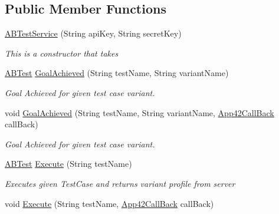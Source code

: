 \subsection*{Public Member Functions}
\begin{DoxyCompactItemize}
\item 
\hyperlink{classcom_1_1shephertz_1_1app42_1_1paas_1_1sdk_1_1csharp_1_1ab_test_1_1_a_b_test_service_a0e66bd8004f93f004171e25097e4d2d6}{A\+B\+Test\+Service} (String api\+Key, String secret\+Key)
\begin{DoxyCompactList}\small\item\em This is a constructor that takes \end{DoxyCompactList}\item 
\hyperlink{classcom_1_1shephertz_1_1app42_1_1paas_1_1sdk_1_1csharp_1_1ab_test_1_1_a_b_test}{A\+B\+Test} \hyperlink{classcom_1_1shephertz_1_1app42_1_1paas_1_1sdk_1_1csharp_1_1ab_test_1_1_a_b_test_service_acab0f2a6f9fa55df32437f0bc0eec12c}{Goal\+Achieved} (String test\+Name, String variant\+Name)
\begin{DoxyCompactList}\small\item\em Goal Achieved for given test case variant. \end{DoxyCompactList}\item 
void \hyperlink{classcom_1_1shephertz_1_1app42_1_1paas_1_1sdk_1_1csharp_1_1ab_test_1_1_a_b_test_service_ae1764c19e9cec727366566388213c2c2}{Goal\+Achieved} (String test\+Name, String variant\+Name, \hyperlink{interfacecom_1_1shephertz_1_1app42_1_1paas_1_1sdk_1_1csharp_1_1_app42_call_back}{App42\+Call\+Back} call\+Back)
\begin{DoxyCompactList}\small\item\em Goal Achieved for given test case variant. \end{DoxyCompactList}\item 
\hyperlink{classcom_1_1shephertz_1_1app42_1_1paas_1_1sdk_1_1csharp_1_1ab_test_1_1_a_b_test}{A\+B\+Test} \hyperlink{classcom_1_1shephertz_1_1app42_1_1paas_1_1sdk_1_1csharp_1_1ab_test_1_1_a_b_test_service_a3d7da96d74de3f1bf0b9d8151a8c9b14}{Execute} (String test\+Name)
\begin{DoxyCompactList}\small\item\em Executes given Test\+Case and returns variant profile from server \end{DoxyCompactList}\item 
void \hyperlink{classcom_1_1shephertz_1_1app42_1_1paas_1_1sdk_1_1csharp_1_1ab_test_1_1_a_b_test_service_ad6ab81dc6c87cce645483482a1b2b8ae}{Execute} (String test\+Name, \hyperlink{interfacecom_1_1shephertz_1_1app42_1_1paas_1_1sdk_1_1csharp_1_1_app42_call_back}{App42\+Call\+Back} call\+Back)

\end{DoxyCompactItemize}
